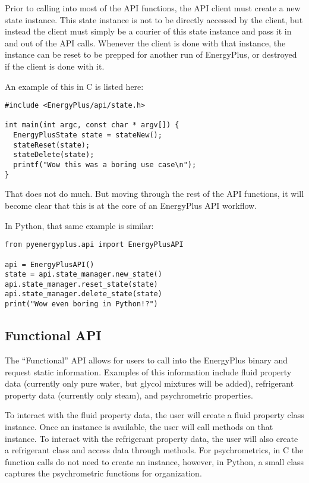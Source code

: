 Prior to calling into most of the API functions, the API client must create a new state instance.
This state instance is not to be directly accessed by the client, but instead the client must simply be a courier of this state instance and pass it in and out of the API calls.
Whenever the client is done with that instance, the instance can be reset to be prepped for another run of EnergyPlus, or destroyed if the client is done with it.

An example of this in C is listed here:

\begin{lstlisting}
#include <EnergyPlus/api/state.h>

int main(int argc, const char * argv[]) {
  EnergyPlusState state = stateNew();
  stateReset(state);
  stateDelete(state);
  printf("Wow this was a boring use case\n");
}
\end{lstlisting}

That does not do much.
But moving through the rest of the API functions, it will become clear that this is at the core of an EnergyPlus API workflow.

In Python, that same example is similar:

\begin{lstlisting}
from pyenergyplus.api import EnergyPlusAPI

api = EnergyPlusAPI()
state = api.state_manager.new_state()
api.state_manager.reset_state(state)
api.state_manager.delete_state(state)
print("Wow even boring in Python!?")
\end{lstlisting}

\subsection{Functional API}\label{subsec:functional-api}

The ``Functional'' API allows for users to call into the EnergyPlus binary and request static information.
Examples of this information include fluid property data (currently only pure water, but glycol mixtures will be added), refrigerant property data (currently only steam), and psychrometric properties.

To interact with the fluid property data, the user will create a fluid property class instance.
Once an instance is available, the user will call methods on that instance.
To interact with the refrigerant property data, the user will also create a refrigerant class and access data through methods.
For psychrometrics, in C the function calls do not need to create an instance, however, in Python, a small class captures the psychrometric functions for organization.

